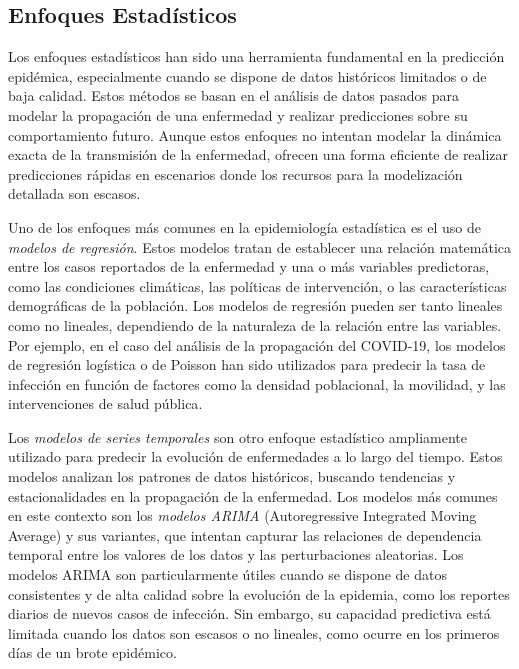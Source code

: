 \subsection{Enfoques Estadísticos}\label{section:statistical-approaches}

Los enfoques estadísticos han sido una herramienta fundamental en la predicción epidémica, especialmente cuando se dispone de datos históricos limitados o de baja calidad. Estos métodos se basan en el análisis de datos pasados para modelar la propagación de una enfermedad y realizar predicciones sobre su comportamiento futuro\parencite{Chowell2016EarlyGrowth, Mata2021MathematicalEpidemics}. Aunque estos enfoques no intentan modelar la dinámica exacta de la transmisión de la enfermedad, ofrecen una forma eficiente de realizar predicciones rápidas en escenarios donde los recursos para la modelización detallada son escasos.

Uno de los enfoques más comunes en la epidemiología estadística es el uso de \textit{modelos de regresión}. Estos modelos tratan de establecer una relación matemática entre los casos reportados de la enfermedad y una o más variables predictoras, como las condiciones climáticas, las políticas de intervención, o las características demográficas de la población\parencite{Rodriguez2022DataCentric}. Los modelos de regresión pueden ser tanto lineales como no lineales, dependiendo de la naturaleza de la relación entre las variables. Por ejemplo, en el caso del análisis de la propagación del COVID-19, los modelos de regresión logística o de Poisson han sido utilizados para predecir la tasa de infección en función de factores como la densidad poblacional, la movilidad, y las intervenciones de salud pública\parencite{Shinde2020ForecastingCOVID}.

Los \textit{modelos de series temporales} son otro enfoque estadístico ampliamente utilizado para predecir la evolución de enfermedades a lo largo del tiempo. Estos modelos analizan los patrones de datos históricos, buscando tendencias y estacionalidades en la propagación de la enfermedad. Los modelos más comunes en este contexto son los \textit{modelos ARIMA} (Autoregressive Integrated Moving Average) y sus variantes, que intentan capturar las relaciones de dependencia temporal entre los valores de los datos y las perturbaciones aleatorias\parencite{LimZohren2020TimeSeries, Chowell2016EarlyGrowth}. Los modelos ARIMA son particularmente útiles cuando se dispone de datos consistentes y de alta calidad sobre la evolución de la epidemia, como los reportes diarios de nuevos casos de infección. Sin embargo, su capacidad predictiva está limitada cuando los datos son escasos o no lineales, como ocurre en los primeros días de un brote epidémico\parencite{Chowell2016EarlyGrowth, Moein2021SIRInefficiency}.

